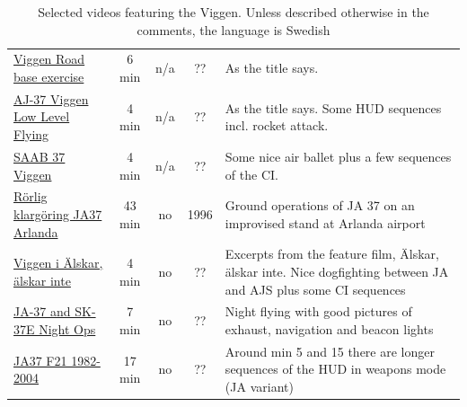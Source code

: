 \begin{landscape}
\begin{table}[!th]
\begin{tabular}{|p{5cm}|c|c|c|p{9cm}|}
\href{https://www.youtube.com/watch?v=slm9ksxU0HY}{Viggen Road base exercise} & 6 min & n/a & ?? & As the title says.\\
\href{https://www.youtube.com/watch?v=hWrsP3hq5M8}{AJ-37 Viggen Low Level Flying} & 4 min & n/a & ?? & As the title says. Some HUD sequences incl. rocket attack.\\
\href{https://www.youtube.com/watch?v=UOszNlNeRVs}{SAAB 37 Viggen} & 4 min & n/a & ?? & Some nice air ballet plus a few sequences of the CI.\\
\href{https://www.youtube.com/watch?v=IbsYsUvCy7s}{Rörlig klargöring JA37 Arlanda} & 43 min & no & 1996 & Ground operations of JA 37 on an improvised stand at Arlanda airport\\
\href{https://vimeo.com/60091080}{Viggen i Älskar, älskar inte} & 4 min & no & ?? & Excerpts from the feature film, Älskar, älskar inte. Nice dogfighting between JA and AJS plus some CI sequences\\
\href{https://www.youtube.com/watch?v=eT00_OVrv7o}{JA-37 and SK-37E Night Ops} & 7 min & no & ?? & Night flying with good pictures of exhaust, navigation and beacon lights\\
\href{https://www.youtube.com/watch?v=0ocSUd9_5Tw}{JA37 F21 1982-2004} & 17 min & no & ?? & Around min 5 and 15 there are longer sequences of the HUD in weapons mode (JA variant)\\

\hline
\end{tabular}
\caption{Selected videos featuring the Viggen. Unless described otherwise in the comments, the language is Swedish}
\end{table}

\end{landscape}


